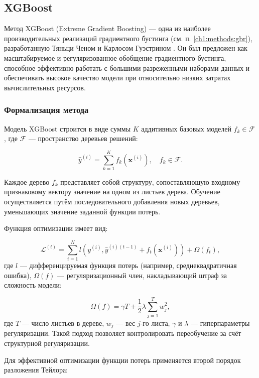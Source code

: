 \subsection{XGBoost}

Метод XGBoost (Extreme Gradient Boosting) --- одна из наиболее производительных реализаций градиентного бустинга (см. п. \ref{ch1:methods:gbr}), разработанную Тяньци Ченом и Карлосом Гуэстрином \cite{Chen2016}. Он был предложен как масштабируемое и регуляризованное обобщение градиентного бустинга, способное эффективно работать с большими разреженными наборами данных и обеспечивать высокое качество модели при относительно низких затратах вычислительных ресурсов.

\subsubsection{Формализация метода}

Модель XGBoost строится в виде суммы $K$ аддитивных базовых моделей $f_k \in \mathcal{F}$, где $\mathcal{F}$ — пространство деревьев решений:

\begin{equation}
\hat{y}^{(i)} = \sum_{k=1}^{K} f_k(\mathbf{x}^{(i)}), \quad f_k \in \mathcal{F}.
\end{equation}

Каждое дерево $f_k$ представляет собой структуру, сопоставляющую входному признаковому вектору значение на одном из листьев дерева. Обучение осуществляется путём последовательного добавления новых деревьев, уменьшающих значение заданной функции потерь.

Функция оптимизации имеет вид:

\begin{equation}
\mathcal{L}^{(t)} = \sum_{i=1}^N l\left(y^{(i)}, \hat{y}^{(i)(t-1)} + f_t(\mathbf{x}^{(i)})\right) + \Omega(f_t),
\end{equation}
где $l$ — дифференцируемая функция потерь (например, среднеквадратичная ошибка), $\Omega(f)$ — регуляризационный член, накладывающий штраф за сложность модели:

\begin{equation}
\Omega(f) = \gamma T + \frac{1}{2} \lambda \sum_{j=1}^{T} w_j^2,
\end{equation}
где $T$ — число листьев в дереве, $w_j$ — вес $j$-го листа, $\gamma$ и $\lambda$ — гиперпараметры регуляризации. Такой подход позволяет контролировать переобучение за счёт структурной регуляризации.

Для эффективной оптимизации функции потерь применяется второй порядок разложения Тейлора:

